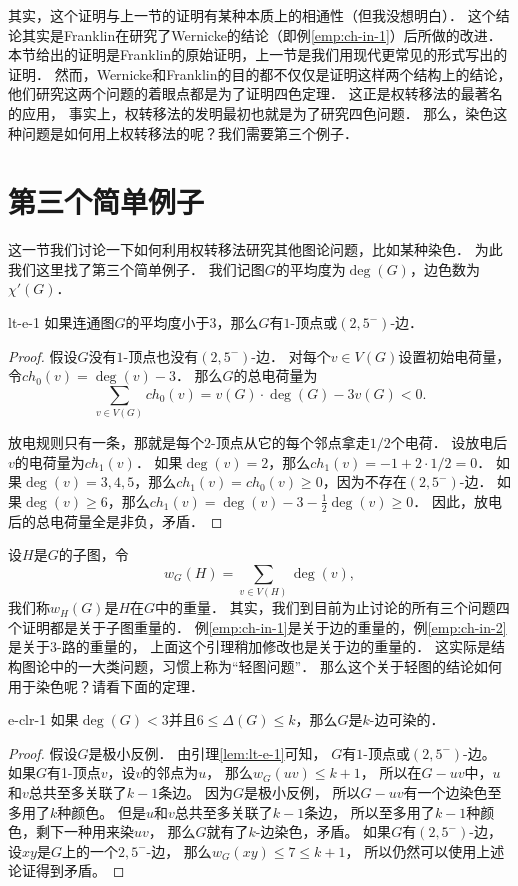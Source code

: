 \documentclass[cn,fancy,blue,11pt]{elegantbook}
\begin{document}
其实，这个证明与上一节的证明有某种本质上的相通性（但我没想明白）．
这个结论其实是Franklin在研究了Wernicke的结论（即例\ref{emp:ch-in-1}）后所做的改进．
本节给出的证明是Franklin的原始证明，上一节是我们用现代更常见的形式写出的证明．
然而，Wernicke和Franklin的目的都不仅仅是证明这样两个结构上的结论，
他们研究这两个问题的着眼点都是为了证明四色定理．
这正是权转移法的最著名的应用，
事实上，权转移法的发明最初也就是为了研究四色问题．
那么，染色这种问题是如何用上权转移法的呢？我们需要第三个例子．

\section{第三个简单例子}

这一节我们讨论一下如何利用权转移法研究其他图论问题，比如某种染色．
为此我们这里找了第三个简单例子．
我们记图$G$的平均度为$\deg(G)$，边色数为$\chi'(G)$．

\begin{lemma}{}{lt-e-1}
	如果连通图$G$的平均度小于$3$，那么$G$有$1$-顶点或$(2,5^-)$-边．
\end{lemma}

\begin{proof}
	假设$G$没有$1$-顶点也没有$(2,5^-)$-边．
	对每个$v\in V(G)$设置初始电荷量，令$ch_0(v)=\deg(v)-3$．
	那么$G$的总电荷量为
	\[
		\sum_{v\in V(G)}ch_0(v)=v(G)\cdot \deg(G)-3v(G)<0.
	\]

	放电规则只有一条，那就是每个$2$-顶点从它的每个邻点拿走$1/2$个电荷．
	设放电后$v$的电荷量为$ch_1(v)$．
	如果$\deg(v)=2$，那么$ch_1(v)=-1+2\cdot1/2=0$．
	如果$\deg(v)=3,4,5$，那么$ch_1(v)=ch_0(v)\ge0$，因为不存在$(2,5^-)$-边．
	如果$\deg(v)\ge6$，那么$ch_1(v)=\deg(v)-3-\frac{1}{2}\deg(v)\ge0$．
	因此，放电后的总电荷量全是非负，矛盾．
\end{proof}

设$H$是$G$的子图，令
\[
	w_G(H)=\sum_{v\in V(H)}\deg(v),
\]
我们称$w_H(G)$是$H$在$G$中的重量．
其实，我们到目前为止讨论的所有三个问题四个证明都是关于子图重量的．
例\ref{emp:ch-in-1}是关于边的重量的，例\ref{emp:ch-in-2}是关于$3$-路的重量的，
上面这个引理稍加修改也是关于边的重量的．
这实际是结构图论中的一大类问题，习惯上称为``轻图问题''．
那么这个关于轻图的结论如何用于染色呢？请看下面的定理．

\begin{theorem}{}{e-clr-1}
	如果$\deg(G)<3$并且$6\le\Delta(G)\le k$，那么$G$是$k$-边可染的．
\end{theorem}

\begin{proof}
	假设$G$是极小反例．
	由引理\ref{lem:lt-e-1}可知，
	$G$有$1$-顶点或$(2,5^-)$-边。
	如果$G$有1-顶点$v$，设$v$的邻点为$u$，
	那么$w_G(uv)\le k+1$，
	所以在$G-uv$中，$u$和$v$总共至多关联了$k-1$条边。
	因为$G$是极小反例，
	所以$G-uv$有一个边染色至多用了$k$种颜色。
	但是$u$和$v$总共至多关联了$k-1$条边，
	所以至多用了$k-1$种颜色，剩下一种用来染$uv$，
	那么$G$就有了$k$-边染色，矛盾。
	如果$G$有$(2,5^-)$-边，
	设$xy$是$G$上的一个$2,5^-$-边，
	那么$w_G(xy)\le 7\le k+1$，
	所以仍然可以使用上述论证得到矛盾。
\end{proof}
\end{document}
